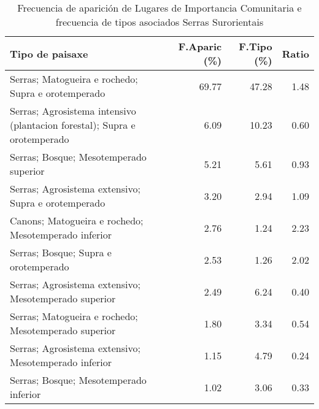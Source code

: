 \begin{table}[p]
\centering
\caption{Frecuencia de aparición de Lugares de Importancia Comunitaria e frecuencia de tipos asociados Serras Surorientais} 
\label{vnatura9}
\begin{tabular}{lrrr}
  \hline
Tipo de paisaxe & F.Aparic (\%) & F.Tipo (\%) & Ratio \\ 
  \hline
Serras; Matogueira e rochedo; Supra e orotemperado & 69.77 & 47.28 & 1.48 \\ 
  Serras; Agrosistema intensivo (plantacion forestal); Supra e orotemperado & 6.09 & 10.23 & 0.60 \\ 
  Serras; Bosque; Mesotemperado superior & 5.21 & 5.61 & 0.93 \\ 
  Serras; Agrosistema extensivo; Supra e orotemperado & 3.20 & 2.94 & 1.09 \\ 
  Canons; Matogueira e rochedo; Mesotemperado inferior & 2.76 & 1.24 & 2.23 \\ 
  Serras; Bosque; Supra e orotemperado & 2.53 & 1.26 & 2.02 \\ 
  Serras; Agrosistema extensivo; Mesotemperado superior & 2.49 & 6.24 & 0.40 \\ 
  Serras; Matogueira e rochedo; Mesotemperado superior & 1.80 & 3.34 & 0.54 \\ 
  Serras; Agrosistema extensivo; Mesotemperado inferior & 1.15 & 4.79 & 0.24 \\ 
  Serras; Bosque; Mesotemperado inferior & 1.02 & 3.06 & 0.33 \\ 
   \hline
\end{tabular}
\end{table}
